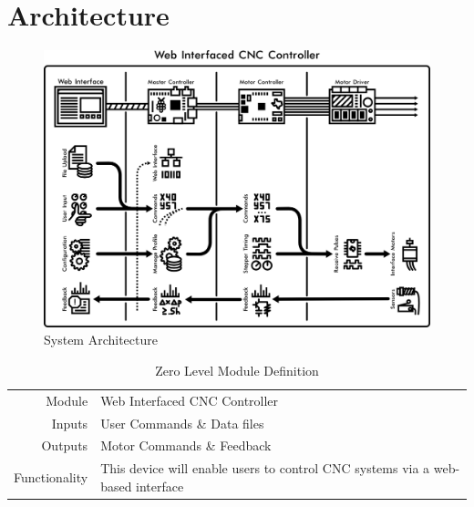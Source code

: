 \chapter{Architecture}

\begin{figure}[h]
	\centering
	\includegraphics[width=1\textwidth]{architecture.png}
	\caption{System Architecture}
	\label{fig:architecture}
\end{figure}

\begin{table}[ht] 
	\caption{Zero Level Module Definition}
	\label{table:zerolevel}
	\centering 
	\begin{tabular}{|r p{10cm}|} 
		\hline\hline
		Module		& Web Interfaced CNC Controller \\ 
		Inputs		& User Commands \& Data files 	\\ 
		Outputs		& Motor Commands \& Feedback	\\ 
		Functionality	& This device will enable users to control CNC systems via a web-based interface 	\\ 
		\hline
		\end{tabular} 
\end{table}

